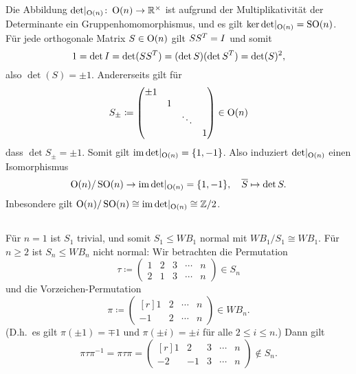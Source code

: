 \subsection{}

Die Abbildung $\restrict{\det}{\orthogonal{n}} \colon \orthogonal{n} \to \Real^\times$ ist aufgrund der Multiplikativität der Determinante ein Gruppenhomomorphismus, und es gilt $\ker \restrict{\det}{\orthogonal{n}} = \sorthogonal{n}$.
Für jede orthogonale Matrix $S \in \operatorname{O}(n)$ gilt $S S^T = I$ und somit
\[
    1
  = \det I
  = \det (S S^T)
  = (\det S) (\det S^T)
  = \det(S)^2,
\]
also $\det(S) = \pm 1$.
Andererseits gilt für
\[
            S_{\pm}
  \coloneqq \begin{pmatrix}
              \pm 1 &   &         &     \\
                    & 1 &         &     \\
                    &   & \ddots  &     \\
                    &   &         & 1
            \end{pmatrix}
  \in       \operatorname{O}(n)
\]
dass $\det S_{\pm} = \pm 1$.
Somit gilt $\im \restrict{\det}{\orthogonal{n}} = \{1, -1\}$.
Also induziert $\restrict{\det}{\orthogonal{n}}$ einen Isomorphismus
\[
          \orthogonal{n} / \sorthogonal{n}
  \to     \im \restrict{\det}{\orthogonal{n}}
  =       \{1, -1\},
  \quad   \class{S}
  \mapsto \det S.
\]
Inbesondere gilt $\orthogonal{n} / \sorthogonal{n} \cong \im \restrict{\det}{\orthogonal{n}} \cong \Integer/2$.





\subsection{}

Für $n = 1$ ist $S_1$ trivial, und somit $S_1 \leq WB_1$ normal mit $WB_1/S_1 \cong WB_1$.
Für $n \geq 2$ ist $S_n \leq WB_n$ nicht normal:
Wir betrachten die Permutation
\[
            \tau
  \coloneqq \begin{pmatrix}
              1 & 2 & 3 & \dotsm & n  \\
              2 & 1 & 3 & \dotsm & n
            \end{pmatrix}
  \in       S_n
\]
und die Vorzeichen-Permutation
\[
            \pi
  \coloneqq \begin{pmatrix*}[r]
               1 & 2 & \dotsm & n  \\
              -1 & 2 & \dotsm & n
            \end{pmatrix*}
  \in       WB_n.
\]
(D.h.\ es gilt $\pi(\pm 1) = \mp 1$ und $\pi(\pm i) = \pm i$ für alle $2 \leq i \leq n$.)
Dann gilt
\[
    \pi \tau \pi^{-1}
  = \pi \tau \pi
  = \begin{pmatrix*}[r]
       1 &  2 & 3 & \dotsm & n  \\
      -2 & -1 & 3 & \dotsm & n
    \end{pmatrix*}
  \notin S_n.
\]





